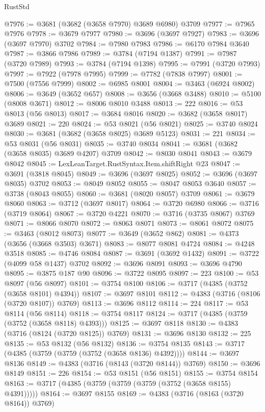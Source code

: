 \begin{lexlean}{RustStd}
\begin{coremodule}
@7976 := @3681 (@3682 (@3658 @7970) @3689 @6980) @3709
@7977 := @7965 @7976
@7978 := @3679 @7977
@7980 := @3696 (@3697 @7927)
@7983 := @3696 (@3697 @7970) @3702
@7984 := @7980 @7983
@7986 := @6170 @7984 @3640
@7987 := @3866 @7986
@7989 := @3784 (@7194 @1387)
@7991 := @7987 (@3720 @7989)
@7993 := @3784 (@7194 @1398)
@7995 := @7991 (@3720 @7993)
@7997 := @7922 (@7978 @7995)
@7999 := @7782 (@7838 @7997)
@8001 := @7500 (@7556 @7999)
@8002 := @6985 @8001
@8004 := @3463 (@6924 @8002)
@8006 := @3649 (@3652 @657)
@8008 := @3656 (@3668 @3488)
@8010 := @5100 (@8008 @3671)
@8012 := @8006 @8010 @3488
@8013 := 222
@8016 := @53 @8013 (@56 @8013)
@8017 := @3684 @8016
@8020 := @3682 (@3658 @8017) @3689
@8021 := 220
@8024 := @53 @8021 (@56 @8021)
@8025 := @3740 @8024
@8030 := @3681 (@3682 (@3658 @8025) @3689 @5123)
@8031 := 221
@8034 := @53 @8031 (@56 @8031)
@8035 := @3740 @8034
@8041 := @3681 (@3682 (@3658 @8035) @3689 @4207) @3709
@8042 := @8030 @8041
@8043 := @3679 @8042
@8045 := LexLeanTarget.RustSyntax.Item.shiftRight @23
@8047 := @3691 (@3818 @8045)
@8049 := @3696 (@3697 @8025)
@8052 := @3696 (@3697 @8035) @3702
@8053 := @8049 @8052
@8055 := @8047 @8053 @3640
@8057 := @3738 (@8043 @8055)
@8060 := @3681 (@8020 @8057) @3709
@8061 := @3679 @8060
@8063 := @3712 (@3697 @8017)
@8064 := @3720 @6980
@8066 := @3716 (@3719 @8064)
@8067 := @3720 @4221
@8070 := @3716 (@3735 @8067) @3769
@8071 := @8066 @8070
@8072 := @8063 @8071
@8073 := @8061 @8072
@8075 := @3463 (@8012 @8073)
@8077 := @3649 (@3652 @862)
@8081 := @4373 (@3656 (@3668 @3503) @3671)
@8083 := @8077 @8081 @4724
@8084 := @4248 @3518
@8085 := @4746 @8084
@8087 := @3691 (@3692 @1432)
@8091 := @3722 (@4099 @58 @1437) @3702
@8092 := @3696 @8091
@8093 := @3696 @4790
@8095 := @3875 @187 @90
@8096 := @3722 @8095
@8097 := 223
@8100 := @53 @8097 (@56 @8097)
@8101 := @3754 @8100
@8106 := @3717 (@4385 (@3752 (@3658 @8101) @4394))
@8107 := @3697 @8101
@8112 := @4383 (@3716 (@8106 (@3720 @8107)) @3769)
@8113 := @3696 @8112
@8114 := 224
@8117 := @53 @8114 (@56 @8114)
@8118 := @3754 @8117
@8124 := @3717 (@4385 (@3759 (@3752 (@3658 @8118) @4393)))
@8125 := @3697 @8118
@8130 := @4383 (@3716 (@8124 (@3720 @8125)) @3769)
@8131 := @3696 @8130
@8132 := 225
@8135 := @53 @8132 (@56 @8132)
@8136 := @3754 @8135
@8143 := @3717 (@4385 (@3759 (@3759 (@3752 (@3658 @8136) @4392))))
@8144 := @3697 @8136
@8149 := @4383 (@3716 (@8143 (@3720 @8144)) @3769)
@8150 := @3696 @8149
@8151 := 226
@8154 := @53 @8151 (@56 @8151)
@8155 := @3754 @8154
@8163 := @3717 (@4385 (@3759 (@3759 (@3759 (@3752 (@3658 @8155) @4391)))))
@8164 := @3697 @8155
@8169 := @4383 (@3716 (@8163 (@3720 @8164)) @3769)

\end{coremodule}
\end{lexlean}
